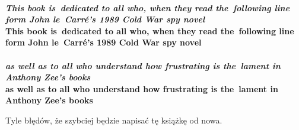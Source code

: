 








\noi
{} \\
\Jest \textbf{\emph{This book is~dedicated to all who, when they read
    the~following line form John le~Carr\'{e}'s 1989 Cold War spy
    novel}} \\
\Powin \textbf{This book is~dedicated to all who, when they read
  the~following line form John le~Carr\'{e}'s 1989 Cold War spy
  novel} \\
 \\
\Jest \emph{\textbf{as well as to all who understand how frustrating is
    the~lament in Anthony Zee's books}} \\
\Powin \textbf{as well as to all who understand how frustrating is
  the~lament in Anthony Zee's books} \\

\vspace{\spaceTwo}







 \start Tyle błędów, że szybciej będzie napisać tę
książkę od nowa.


